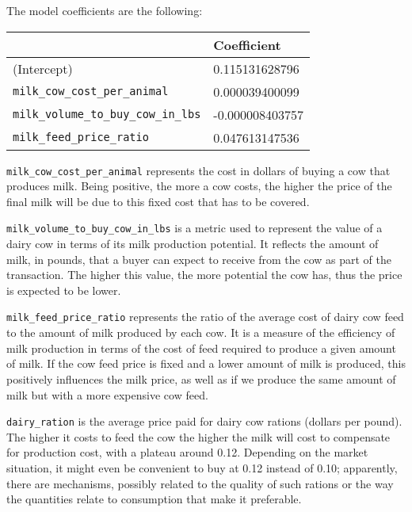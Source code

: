 The model coefficients are the following:

\begin{table}[H]
\centering
\begin{tabular}{ll}
\toprule
                              & Coefficient     \\
\midrule
(Intercept)                   & \hphantom{-}0.115131628796  \\
\texttt{milk\_cow\_cost\_per\_animal}      & \hphantom{-}0.000039400099  \\
\texttt{milk\_volume\_to\_buy\_cow\_in\_lbs} & -0.000008403757 \\
\texttt{milk\_feed\_price\_ratio}         & \hphantom{-}0.047613147536 \\
\bottomrule
\end{tabular}
\end{table}

\texttt{milk\_cow\_cost\_per\_animal} represents the cost in dollars of buying a cow that produces milk. Being positive, the more a cow costs, the higher the price of the final milk will be due to this fixed cost that has to be covered.

\texttt{milk\_volume\_to\_buy\_cow\_in\_lbs} is a metric used to represent the value of a dairy cow in terms of its milk production potential. It reflects the amount of milk, in pounds, that a buyer can expect to receive from the cow as part of the transaction. The higher this value, the more potential the cow has, thus the price is expected to be lower.

\texttt{milk\_feed\_price\_ratio} represents the ratio of the average cost of dairy cow feed to the amount of milk produced by each cow. It is a measure of the efficiency of milk production in terms of the cost of feed required to produce a given amount of milk. If the cow feed price is fixed and a lower amount of milk is produced, this positively influences the milk price, as well as if we produce the same amount of milk but with a more expensive cow feed.


\texttt{dairy\_ration} is the average price paid for dairy cow rations (dollars per pound). The higher it costs to feed the cow the higher the milk will cost to compensate for production cost, with a plateau around 0.12. Depending on the market situation, it might even be convenient to buy at 0.12 instead of 0.10; apparently, there are mechanisms, possibly related to the quality of such rations or the way the quantities relate to consumption that make it preferable.

